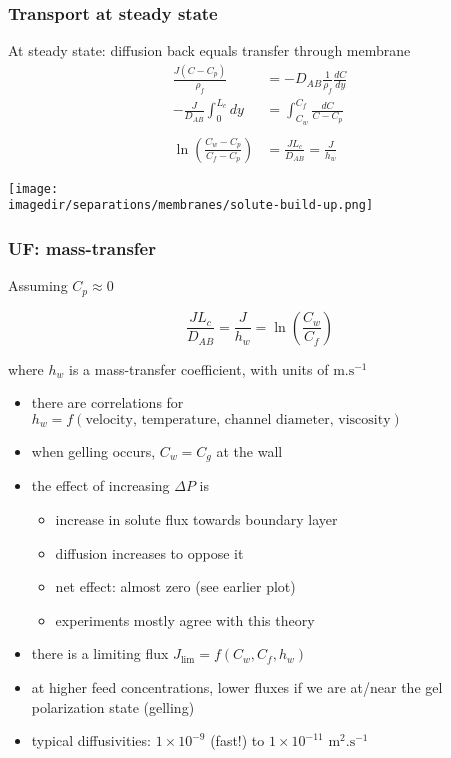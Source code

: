 \begin{frame}\frametitle{Transport at steady state}
	At steady state: diffusion back equals transfer through membrane
	\[ 
		\begin{array}{rl}
		 	\displaystyle  \frac{J(C - C_p)}{\rho_f}  &= -D_{AB} \displaystyle \frac{1}{\rho_f}\frac{dC}{dy} \\
			\displaystyle -\frac{J}{D_{AB}} \int_{0}^{L_c}{dy} &= \displaystyle \int_{C_w}^{C_f}{\frac{dC}{C-C_p}} \\ \\
			\displaystyle\ln\left(\frac{C_w - C_p}{C_f - C_p}\right) &= \displaystyle\frac{J L_c}{D_{AB}} = \displaystyle \frac{J}{h_w}
		\end{array}
	\]
	\vspace{6pt}
	\begin{center}
		\texttt{[image: \\imagedir/separations/membranes/solute-build-up.png]}
	\end{center}	
\end{frame}

\begin{frame}\frametitle{UF: mass-transfer {\color{myOrange}{key points}}}
	Assuming $C_p \approx 0$
	\begin{exampleblock}{}
		\[
			\displaystyle\frac{J L_c}{D_{AB}} =  \displaystyle \frac{J}{h_w} = \displaystyle \ln\left(\frac{C_w }{C_f }\right) 
		\]
	\end{exampleblock}
	where $h_w$ is a  mass-transfer coefficient, with units of $\text{m.s}^{-1}$
	\begin{itemize}
		\item	there are correlations for $h_w= f(\text{velocity, temperature, channel diameter, viscosity})$
		\item	when gelling occurs, $C_w = C_g$ at the wall
		\item	the effect of increasing $\Delta P$ is 
		\begin{itemize}
			\item	increase in solute flux towards boundary layer
			\item	diffusion increases to oppose it
			\item	net effect: almost zero (see earlier plot)
			\item	experiments mostly agree with this theory
		\end{itemize}
		\item	there is a limiting flux $J_\text{lim} = f(C_w, C_f, h_w)$
		\item	at higher feed concentrations, lower fluxes if we are at/near the gel polarization state (gelling)
		\item	typical diffusivities: $1 \times 10^{-9}$ (fast!) to $1 \times 10^{-11} \text{~m}^2\text{.s}^{-1}$ 
	\end{itemize}
\end{frame}

